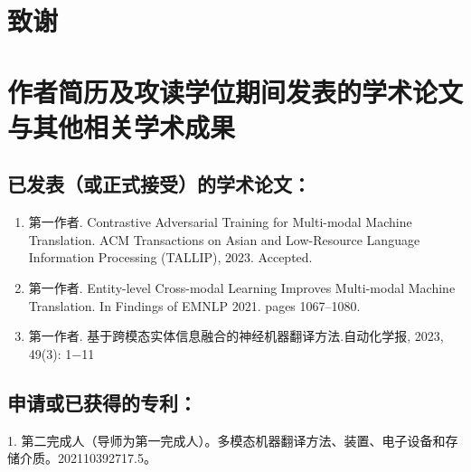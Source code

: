 \chapter[致谢]{致\quad 谢}%



\chapter{作者简历及攻读学位期间发表的学术论文与其他相关学术成果}





\section*{已发表（或正式接受）的学术论文：}

{
\setlist[enumerate]{}%
\begin{enumerate}[nosep]
    \item 第一作者. Contrastive Adversarial Training for Multi-modal Machine Translation. ACM Transactions on Asian and Low-Resource Language Information Processing (TALLIP), 2023. Accepted.
    \item 第一作者. Entity-level Cross-modal Learning Improves Multi-modal Machine Translation. In Findings of EMNLP 2021. pages 1067–1080.
    \item 第一作者. 基于跨模态实体信息融合的神经机器翻译方法.自动化学报, 2023, 49(3): 1−11
\end{enumerate}
}

\section*{申请或已获得的专利：}

1. 第二完成人（导师为第一完成人）。多模态机器翻译方法、装置、电子设备和存储介质。202110392717.5。



\cleardoublepage[plain]%
